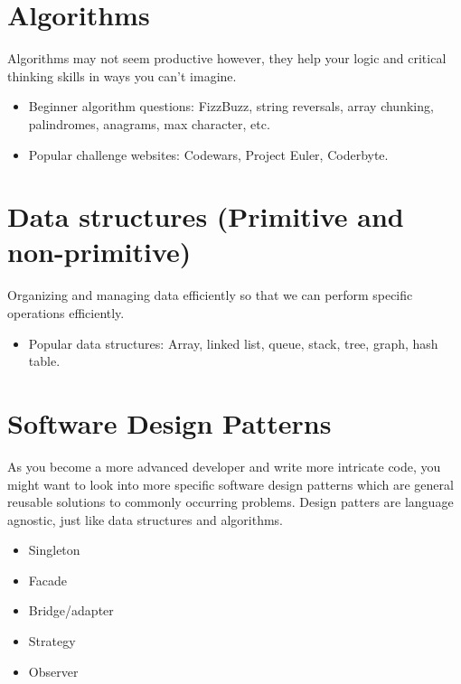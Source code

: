 \section{Algorithms}
Algorithms may not seem productive however, they help your logic and critical thinking skills in ways you can't imagine.

\begin{itemize}
    \item Beginner algorithm questions: FizzBuzz, string reversals, array chunking, palindromes, anagrams, max character, etc.
    \item Popular challenge websites: Codewars, Project Euler, Coderbyte.
\end{itemize}

\section{Data structures (Primitive and non-primitive)}
Organizing and managing data efficiently so that we can perform specific operations efficiently. 

\begin{itemize}
    \item Popular data structures: Array, linked list, queue, stack, tree, graph, hash table.
\end{itemize}

\section{Software Design Patterns}

As you become a more advanced developer and write more intricate code, you might want to look into more specific software design patterns which are general reusable solutions to commonly occurring problems. Design patters are language agnostic, just like data structures and algorithms. 

\begin{itemize}
    \item Singleton
    \item Facade
    \item Bridge/adapter
    \item Strategy
    \item Observer
\end{itemize}